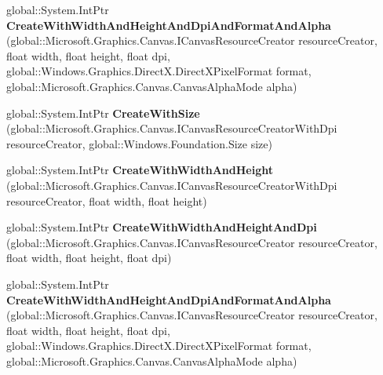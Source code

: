 \begin{DoxyCompactItemize}
global\+::\+System.\+Int\+Ptr {\bfseries Create\+With\+Width\+And\+Height\+And\+Dpi\+And\+Format\+And\+Alpha} (global\+::\+Microsoft.\+Graphics.\+Canvas.\+I\+Canvas\+Resource\+Creator resource\+Creator, float width, float height, float dpi, global\+::\+Windows.\+Graphics.\+Direct\+X.\+Direct\+X\+Pixel\+Format format, global\+::\+Microsoft.\+Graphics.\+Canvas.\+Canvas\+Alpha\+Mode alpha)
\item 
\mbox{\label{interface_microsoft_1_1_graphics_1_1_canvas_1_1_i_canvas_render_target_factory_ac73767c2259e7be23e5908d0eb7862f9}} 
global\+::\+System.\+Int\+Ptr {\bfseries Create\+With\+Size} (global\+::\+Microsoft.\+Graphics.\+Canvas.\+I\+Canvas\+Resource\+Creator\+With\+Dpi resource\+Creator, global\+::\+Windows.\+Foundation.\+Size size)
\item 
\mbox{\label{interface_microsoft_1_1_graphics_1_1_canvas_1_1_i_canvas_render_target_factory_afd51138794b4d13559098c29d90fa247}} 
global\+::\+System.\+Int\+Ptr {\bfseries Create\+With\+Width\+And\+Height} (global\+::\+Microsoft.\+Graphics.\+Canvas.\+I\+Canvas\+Resource\+Creator\+With\+Dpi resource\+Creator, float width, float height)
\item 
\mbox{\label{interface_microsoft_1_1_graphics_1_1_canvas_1_1_i_canvas_render_target_factory_a4955cd48960b91634ca9ebaf71914d35}} 
global\+::\+System.\+Int\+Ptr {\bfseries Create\+With\+Width\+And\+Height\+And\+Dpi} (global\+::\+Microsoft.\+Graphics.\+Canvas.\+I\+Canvas\+Resource\+Creator resource\+Creator, float width, float height, float dpi)
\item 
\mbox{\label{interface_microsoft_1_1_graphics_1_1_canvas_1_1_i_canvas_render_target_factory_a25958fedb26248394e6b8cfbc8e3de9f}} 
global\+::\+System.\+Int\+Ptr {\bfseries Create\+With\+Width\+And\+Height\+And\+Dpi\+And\+Format\+And\+Alpha} (global\+::\+Microsoft.\+Graphics.\+Canvas.\+I\+Canvas\+Resource\+Creator resource\+Creator, float width, float height, float dpi, global\+::\+Windows.\+Graphics.\+Direct\+X.\+Direct\+X\+Pixel\+Format format, global\+::\+Microsoft.\+Graphics.\+Canvas.\+Canvas\+Alpha\+Mode alpha)

\end{DoxyCompactItemize}
